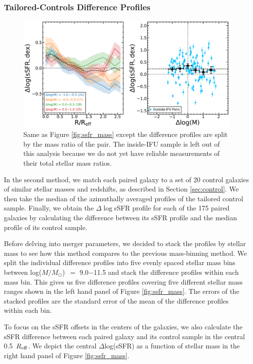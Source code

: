 \documentclass[iop,revtex4,twocolumn,apj,numberedappendix,appendixfloats]{emulateapj}
\newcommand{\reff}{$R_{\rm eff}$}
\newcommand{\logm}{log($M/M_{\odot}$)}
\begin{document}
\subsubsection{Tailored-Controls Difference Profiles}\label{sec:tailored}
\begin{figure}
\centering
\includegraphics[width=0.8\linewidth]{fig/ssfr_dm.pdf}
\caption[]{Same as Figure \ref{fig:ssfr_mass} except the difference profiles are split by the mass ratio of the pair. The inside-IFU sample is left out of this analysis because we do not yet have reliable measurements of their total stellar mass ratios.}
\label{fig:ssfr_dm}
\end{figure}
In the second method, we match each paired galaxy to a set of 20 control galaxies of similar stellar masses and redshifts, as described in Section \ref{sec:control}. We then take the median of the azimuthally averaged profiles of the tailored control sample. Finally, we obtain the $\Delta\log$sSFR profile for each of the 175 paired galaxies by calculating the difference between its sSFR profile and the median profile of its control sample.

Before delving into merger parameters, we decided to stack the profiles by stellar mass to see how this method compares to the previous mass-binning method. We split the individual difference profiles into five evenly spaced stellar mass bins between \logm\ $=$ 9.0$-$11.5 and stack the difference profiles within each mass bin. This gives us five difference profiles covering five different stellar mass ranges shown in the left hand panel of Figure \ref{fig:ssfr_mass}. The errors of the stacked profiles are the standard error of the mean of the difference profiles within each bin.

To focus on the sSFR offsets in the centers of the galaxies, we also calculate the sSFR difference between each paired galaxy and its control sample in the central 0.5~\reff. We depict the central $\Delta$log(sSFR) as a function of stellar mass in the right hand panel of Figure \ref{fig:ssfr_mass}.
\end{document}
